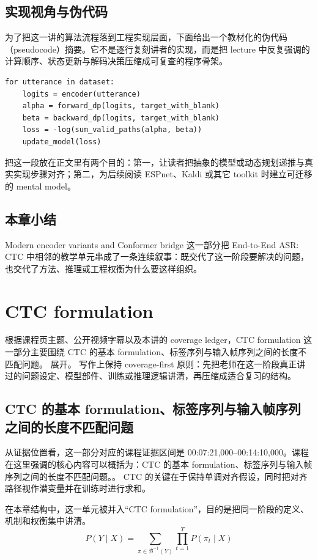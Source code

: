 \documentclass[a4paper]{article}
\begin{document}
\subsection{实现视角与伪代码}
为了把这一讲的算法流程落到工程实现层面，下面给出一个教材化的伪代码（pseudocode）摘要。它不是逐行复刻讲者的实现，而是把 lecture 中反复强调的计算顺序、状态更新与解码决策压缩成可复查的程序骨架。
\begin{lstlisting}[caption={CTC training sketch}]
for utterance in dataset:
    logits = encoder(utterance)
    alpha = forward_dp(logits, target_with_blank)
    beta = backward_dp(logits, target_with_blank)
    loss = -log(sum_valid_paths(alpha, beta))
    update_model(loss)
\end{lstlisting}
把这一段放在正文里有两个目的：第一，让读者把抽象的模型或动态规划递推与真实实现步骤对齐；第二，为后续阅读 ESPnet、Kaldi 或其它 toolkit 时建立可迁移的 mental model。

\subsection{本章小结}
Modern encoder variants and Conformer bridge 这一部分把 End-to-End ASR: CTC 中相邻的教学单元串成了一条连续叙事：既交代了这一阶段要解决的问题，也交代了方法、推理或工程权衡为什么要这样组织。

\section{CTC formulation}
根据课程页主题、公开视频字幕以及本讲的 coverage ledger，CTC formulation 这一部分主要围绕 CTC 的基本 formulation、标签序列与输入帧序列之间的长度不匹配问题。 展开。
写作上保持 coverage-first 原则：先把老师在这一阶段真正讲过的问题设定、模型部件、训练或推理逻辑讲清，再压缩成适合复习的结构。

\subsection{CTC 的基本 formulation、标签序列与输入帧序列之间的长度不匹配问题}
从证据位置看，这一部分对应的课程证据区间是 00:07:21,000--00:14:10,000。课程在这里强调的核心内容可以概括为：CTC 的基本 formulation、标签序列与输入帧序列之间的长度不匹配问题。。
CTC 的关键在于保持单调对齐假设，同时把对齐路径视作潜变量并在训练时进行求和。

在本章结构中，这一单元被并入“CTC formulation”，目的是把同一阶段的定义、机制和权衡集中讲清。
\[
P(Y \mid X) = \sum_{\pi \in \mathcal{B}^{-1}(Y)} \prod_{t=1}^{T} P(\pi_t \mid X)
\]
\end{document}
